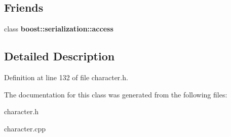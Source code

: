 \subsection*{Friends}
\begin{DoxyCompactItemize}
\item 
\hypertarget{class_player_ac98d07dd8f7b70e16ccb9a01abf56b9c}{}\label{class_player_ac98d07dd8f7b70e16ccb9a01abf56b9c} 
class {\bfseries boost\+::serialization\+::access}
\end{DoxyCompactItemize}


\subsection{Detailed Description}


Definition at line 132 of file character.\+h.



The documentation for this class was generated from the following files\+:\begin{DoxyCompactItemize}
\item 
character.\+h\item 
character.\+cpp\end{DoxyCompactItemize}
